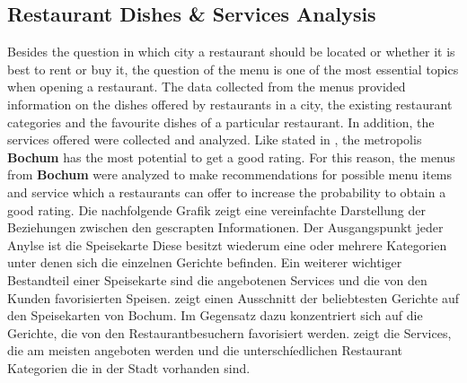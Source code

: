\subsection{Restaurant Dishes \& Services Analysis}
\label{subsec:menu}
Besides the question in which city a restaurant should be located or whether it is best to rent or buy it,
the question of the menu is one of the most essential topics when opening a restaurant.
\newline
The data collected from the menus provided information on the dishes offered by restaurants in a city,
the existing restaurant categories and the favourite dishes of a particular restaurant.
In addition, the services offered were collected and analyzed.
\newline
Like stated in , the metropolis \textbf{Bochum} has the most potential to get a good rating.
For this reason, the menus from \textbf{Bochum} were analyzed to make recommendations for possible menu items and service which a restaurants can offer
to increase the probability to obtain a good rating.
\newline
Die nachfolgende Grafik zeigt eine vereinfachte Darstellung der Beziehungen zwischen den gescrapten Informationen.
Der Ausgangspunkt jeder Anylse ist die Speisekarte
Diese besitzt wiederum eine oder mehrere Kategorien unter denen sich die einzelnen Gerichte befinden.
Ein weiterer wichtiger Bestandteil einer Speisekarte sind die angebotenen Services und die von den Kunden favorisierten Speisen.
\newline
{} zeigt einen Ausschnitt der beliebtesten Gerichte auf den Speisekarten von Bochum.
Im Gegensatz dazu konzentriert sich  auf die Gerichte, die von den Restaurantbesuchern favorisiert werden.
 zeigt die Services, die am meisten angeboten werden und  die unterschíedlichen Restaurant Kategorien die in der Stadt vorhanden sind.
